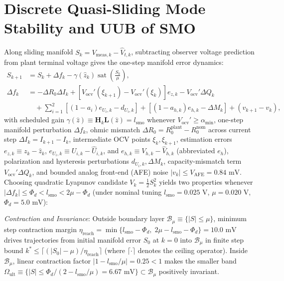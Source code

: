 \documentclass[10pt,a4paper]{article}
\begin{document}
\section{Discrete Quasi-Sliding Mode Stability and UUB of SMO\label{app:lyapunov}}
Along sliding manifold $S_k = V_{\text{meas},k} - \hat{V}_{t,k}$, subtracting observer voltage prediction from plant terminal voltage gives the one-step manifold error dynamics:
\begin{align*}
S_{k+1} &= S_k + \Delta f_k - \gamma(\hat{z}_k)\operatorname{sat}\!\left(\frac{S_k}{\mu}\right), \\
\Delta f_k &= -\Delta R_0 \Delta I_k + \left[V_{\text{ocv}}'(\xi_{k+1}) - V_{\text{ocv}}'(\xi_k)\right] e_{z,k} - V_{\text{ocv}}'\Delta Q_k \\
&\quad + \sum_{i=1}^2 \left[(1-a_i)e_{U_i,k} - d_{U_i,k}\right] + \left[(1-a_{h,k})e_{h,k} - \Delta M_k\right] + (v_{k+1} - v_k),
\end{align*}
with scheduled gain $\gamma(\hat{z}) \equiv \mathbf{H}_k\mathbf{L}(\hat{z}) = l_{\text{smo}}$ whenever $V_{\text{ocv}}' \ge \alpha_{\min}$, one-step manifold perturbation $\Delta f_k$, ohmic mismatch $\Delta R_0 = R_0^{\text{plant}} - R_0^{\text{nom}}$ across current step $\Delta I_k = I_{k+1} - I_k$, intermediate OCV points $\xi_k, \xi_{k+1}$, estimation errors $e_{z,k} \equiv z_k - \hat{z}_k$, $e_{U_i,k} \equiv U_{i,k} - \hat{U}_{i,k}$, and $e_{h,k} \equiv V_{h,k} - \hat{V}_{h,k}$ (abbreviated $e_h$), polarization and hysteresis perturbations $d_{U_i,k}, \Delta M_k$, capacity-mismatch term $V_{\text{ocv}}'\Delta Q_k$, and bounded analog front-end (AFE) noise $|v_k| \le V_{\text{AFE}} = 0.84\text{ mV}$. Choosing quadratic Lyapunov candidate $V_k = \tfrac{1}{2}S_k^2$ yields two properties whenever $|\Delta f_k| \le \Phi_d < l_{\text{smo}} < 2\mu - \Phi_d$ (under nominal tuning $l_{\text{smo}} = 0.025\text{ V}$, $\mu = 0.020\text{ V}$, $\Phi_d = 5.0\text{ mV}$):

\emph{Contraction and Invariance}: Outside boundary layer $\mathcal{B}_\mu \equiv \{|S| \le \mu\}$, minimum step contraction margin $\eta_{\text{reach}} = \min\{l_{\text{smo}} - \Phi_d,\; 2\mu - l_{\text{smo}} - \Phi_d\} = 10.0\text{ mV}$ drives trajectories from initial manifold error $S_0$ at $k=0$ into $\mathcal{B}_\mu$ in finite step bound $k^* \le \lceil (|S_0| - \mu)/\eta_{\text{reach}} \rceil$ (where $\lceil \cdot \rceil$ denotes the ceiling operator). Inside $\mathcal{B}_\mu$, linear contraction factor $|1 - l_{\text{smo}}/\mu| = 0.25 < 1$ makes the smaller band $\Omega_{\text{ult}} \equiv \{|S| \le \Phi_d/(2 - l_{\text{smo}}/\mu) = 6.67\text{ mV}\} \subset \mathcal{B}_\mu$ positively invariant.
\end{document}
